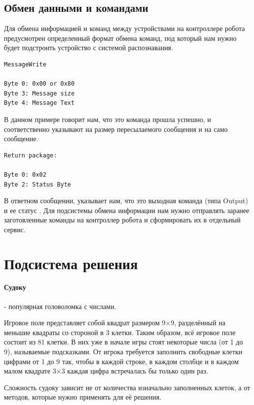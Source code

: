 \subsection{Обмен данными и командами}

Для обмена информацией и команд между устройствами на контроллере робота предусмотрен определенный формат обмена команд, под который нам нужно будет подстроить устройство с системой распознавания.

\begin{lstlisting}[caption=Формат команд для получения потока данных]
MessageWrite

Byte 0: 0x00 or 0x80
Byte 3: Message size
Byte 4: Message Text
\end{lstlisting}
В данном примере  говорит нам, что это команда прошла успешно,  и  соответственно указывают на размер пересылаемого сообщения и на само сообщение.

\begin{lstlisting}[caption=Формат команды ответа]
Return package:

Byte 0: 0x02
Byte 2: Status Byte
\end{lstlisting}
В ответном сообщении,  указывает нам, что это выходная команда (типа Output) и ее статус .
Для подсистемы обмена информации нам нужно отправлять заранее заготовленные команды на контроллер робота и сформировать их в отдельный сервис.

\section{Подсистема решения}

\paragraph{Судоку} - популярная головоломка с числами.

Игровое поле представляет собой квадрат размером 9×9, разделённый на меньшие квадраты со стороной в 3 клетки. Таким образом, всё игровое поле состоит из 81 клетки. В них уже в начале игры стоят некоторые числа (от 1 до 9), называемые подсказками. От игрока требуется заполнить свободные клетки цифрами от 1 до 9 так, чтобы в каждой строке, в каждом столбце и в каждом малом квадрате 3×3 каждая цифра встречалась бы только один раз.

Сложность судоку зависит не от количества изначально заполненных клеток, а от методов, которые нужно применять для её решения.


